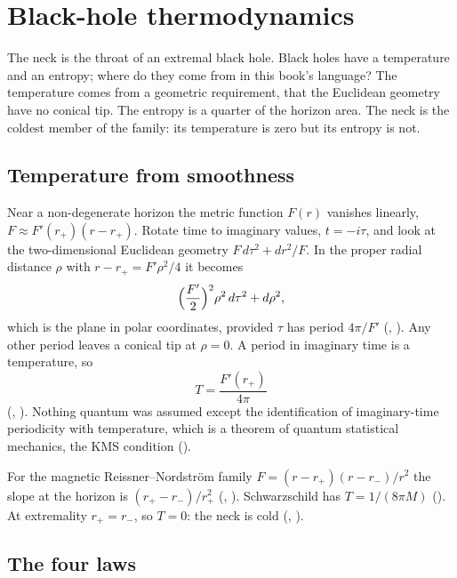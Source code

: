 \chapter{Black-hole thermodynamics}\label{ch:thermo}

\begin{questionbox}
The neck is the throat of an extremal black hole. Black holes have a temperature and an entropy; where do they come from in this book's language? The temperature comes from a geometric requirement, that the Euclidean geometry have no conical tip. The entropy is a quarter of the horizon area. The neck is the coldest member of the family: its temperature is zero but its entropy is not.
\end{questionbox}

\section{Temperature from smoothness}

Near a non-degenerate horizon the metric function $F(r)$ vanishes linearly, $F\approx F'(r_+)(r-r_+)$. Rotate time to imaginary values, $t=-i\tau$, and look at the two-dimensional Euclidean geometry $F\,d\tau^2+dr^2/F$. In the proper radial distance $\rho$ with $r-r_+=F'\rho^2/4$ it becomes
\[
\Bigl(\frac{F'}2\Bigr)^2\rho^2\,d\tau^2+d\rho^2 ,
\]
which is the plane in polar coordinates, provided $\tau$ has period $4\pi/F'$ (, ). Any other period leaves a conical tip at $\rho=0$. A period in imaginary time is a temperature, so
\[
T=\frac{F'(r_+)}{4\pi}
\]
(, ). Nothing quantum was assumed except the identification of imaginary-time periodicity with temperature, which is a theorem of quantum statistical mechanics, the KMS condition ().

For the magnetic Reissner--Nordstr\"om family $F=(r-r_+)(r-r_-)/r^2$ the slope at the horizon is $(r_+-r_-)/r_+^2$ (, ). Schwarzschild has $T=1/(8\pi M)$ (). At extremality $r_+=r_-$, so $T=0$: the neck is cold (, ).

\section{The four laws}

